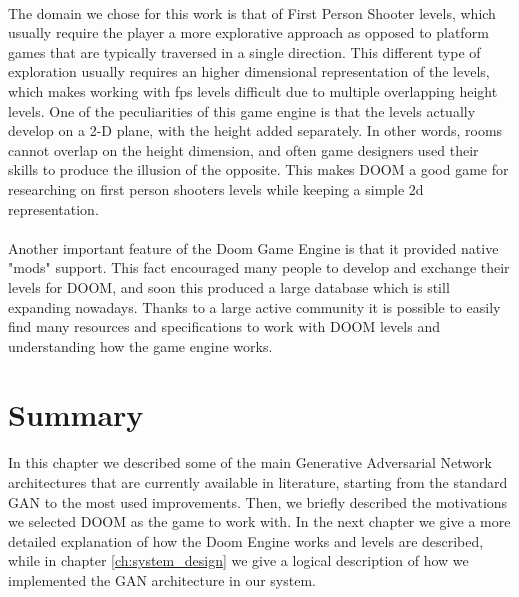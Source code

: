 \paragraph{} The domain we chose for this work is that of First Person Shooter levels, which usually require the player a more explorative approach as opposed to platform games that are typically traversed in a single direction. This different type of exploration usually requires an higher dimensional representation of the levels, which makes working with fps levels difficult due to multiple overlapping height levels. One of the peculiarities of this game engine is that the levels actually develop on a 2-D plane, with the height added separately. In other words, rooms cannot overlap on the height dimension, and often game designers used their skills to produce the illusion of the opposite. This makes DOOM a good game for researching on first person shooters levels while keeping a simple 2d representation. 

\paragraph{} Another important feature of the Doom Game Engine is that it provided native "mods" support. This fact encouraged many people to develop and exchange their levels for DOOM, and soon this produced a large database which is still expanding nowadays. Thanks to a large active community it is possible to easily find many resources and specifications to work with DOOM levels and understanding how the game engine works.

\section{Summary}
In this chapter we described some of the main Generative Adversarial Network architectures that are currently available in literature, starting from the standard GAN to the most used improvements. Then, we briefly described the motivations we selected DOOM as the game to work with. In the next chapter we give a more detailed explanation of how the Doom Engine works and levels are described, while in chapter \ref{ch:system_design} we give a logical description of how we implemented the GAN architecture in our system. 